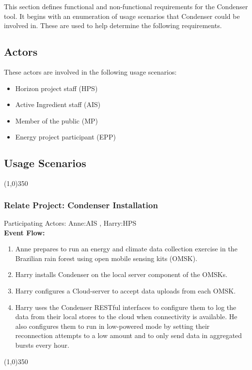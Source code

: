 This section defines functional and non-functional requirements for the Condenser tool. It begins with an enumeration of usage scenarios that Condenser could be involved in. These are used to help determine the following requirements.

\subsection{Actors}
These actors are involved in the following usage scenarios:
		\begin{itemize}
\item Horizon project staff (HPS)
\item Active Ingredient staff (AIS)
\item Member of the public (MP) 
\item Energy	project participant (EPP)
\end{itemize}

\subsection{Usage Scenarios}
	\line(1,0){350}
			\subsubsection{Relate Project: Condenser Installation}
			Participating Actors:  Anne:AIS , Harry:HPS \\
\textbf{Event Flow:}
	\begin{enumerate}
\item  Anne prepares to run an energy and climate data collection exercise in the Brazilian rain forest using open mobile sensing kits (OMSK).
\item  Harry installs Condenser on the local server component of the OMSKs.
\item  Harry configures a Cloud-server to accept data uploads from each OMSK.
\item  Harry uses the Condenser RESTful interfaces to configure them to log the data from their local stores to the cloud when connectivity is available. He also configures them to run in low-powered mode by setting their reconnection attempts to a low amount and to only send data in aggregated bursts every hour.
	\end{enumerate}
	\line(1,0){350}
